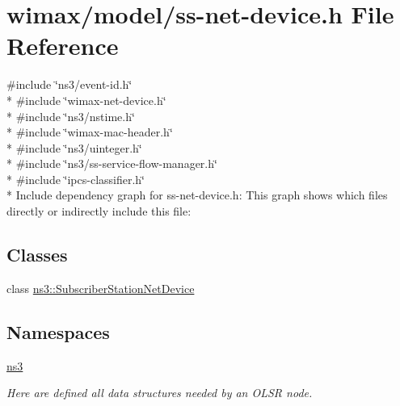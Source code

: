 \hypertarget{ss-net-device_8h}{}\section{wimax/model/ss-\/net-\/device.h File Reference}
\label{ss-net-device_8h}
{\ttfamily \#include \char`\"{}ns3/event-\/id.\+h\char`\"{}}\\*
{\ttfamily \#include \char`\"{}wimax-\/net-\/device.\+h\char`\"{}}\\*
{\ttfamily \#include \char`\"{}ns3/nstime.\+h\char`\"{}}\\*
{\ttfamily \#include \char`\"{}wimax-\/mac-\/header.\+h\char`\"{}}\\*
{\ttfamily \#include \char`\"{}ns3/uinteger.\+h\char`\"{}}\\*
{\ttfamily \#include \char`\"{}ns3/ss-\/service-\/flow-\/manager.\+h\char`\"{}}\\*
{\ttfamily \#include \char`\"{}ipcs-\/classifier.\+h\char`\"{}}\\*
Include dependency graph for ss-\/net-\/device.h\+:
This graph shows which files directly or indirectly include this file\+:
\subsection*{Classes}
\begin{DoxyCompactItemize}
\item 
class \hyperlink{classns3_1_1SubscriberStationNetDevice}{ns3\+::\+Subscriber\+Station\+Net\+Device}
\end{DoxyCompactItemize}
\subsection*{Namespaces}
\begin{DoxyCompactItemize}
\item 
 \hyperlink{namespacens3}{ns3}
\begin{DoxyCompactList}\small\item\em Here are defined all data structures needed by an O\+L\+SR node. \end{DoxyCompactList}\end{DoxyCompactItemize}
